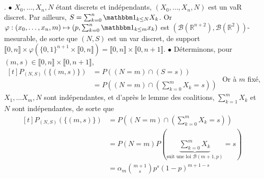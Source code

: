\documentclass{report}
\begin{document}
\subsection{} \noindent{}\\ 
\\ 
\\
. $\bullet$ $X_0,\ldots,X_n,N$ étant discrets et indépendants, $(X_0,\ldots,X_n,N)$ est un vaR discret. Par ailleurs, $S=\sum_{k=0}^n \mathbbm 1_{k\leq N} X_k$. Or $\varphi:(x_0,\ldots,x_n,m)\mapsto (p,\sum_{k=0}^n \mathbbm 1_{k\leq m} x_k)$ est $(\mathcal B(\mathbb R^{n+2}), \mathcal B(\mathbb R^2))$-mesurable, de sorte que $(N,S)$ est un var discret, de support $\llbracket 0,n \rrbracket \times \varphi(\{0,1\}^{n+1} \times \llbracket 0,n\rrbracket)= \llbracket 0,n \rrbracket \times \llbracket 0,n+1 \rrbracket$. \newline
\newline
$\bullet$ Déterminons, pour $(m,s)\in \llbracket 0,n \rrbracket \times \llbracket 0,n+1 \rrbracket$, $\begin{aligned}[t] P_{(N,S)}(\{(m,s)\})
&= P((N=m)\cap (S=s)) \\
&= P((N=m) \cap \left( \sum_{k=0}^m X_k = s\right))
\end{aligned}
$\newline
Or à $m$ fixé, $X_1,\ldots X_m,N$ sont indépendantes, et d'après le lemme des coalitions, $\sum_{k=1}^m X_k$ et $N$ sont indépendantes, de sorte que
$$\begin{aligned}[t] P_{(N,S)}(\{(m,s)\})
&= P((N=m) \cap \left( \sum_{k=0}^m X_k = s\right)) \\
&= P(N=m) P(\underbrace{\sum_{k=0}^m X_k}_{\text{suit une loi }\mathcal B(m+1,p)} = s) \\
&= \alpha_m \binom{m+1}{s}p^s(1-p)^{m+1-s}
\end{aligned}$$
\end{document}
